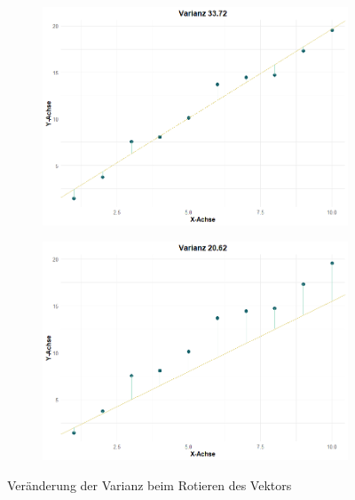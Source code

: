 \documentclass[envcountsame, envcountchap, deutsch]{i-studis}
\begin{document}
\begin{figure}
    \centering

    \begin{subfigure}{0.45\textwidth}
        \includegraphics[width=\linewidth]{projected_points_to_line.png}
    \end{subfigure}
    \hfill
    \begin{subfigure}{0.45\textwidth}
        \includegraphics[width=\linewidth]{projected_points_to_line_low_variance.png}
    \end{subfigure}
    \caption{Veränderung der Varianz beim Rotieren des Vektors}\label{fig:var_max}
\end{figure}
\end{document}
